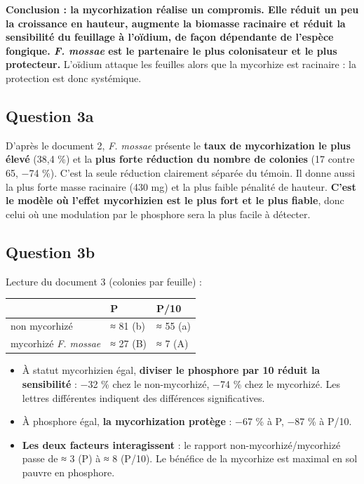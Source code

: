 \documentclass[11pt,a4paper]{article}
\providecommand{\tightlist}{\setlength{\itemsep}{0pt}\setlength{\parskip}{0pt}}
\begin{document}
\textbf{Conclusion : la mycorhization réalise un compromis. Elle réduit un peu la croissance en hauteur, augmente la biomasse racinaire et réduit la sensibilité du feuillage à l'oïdium, de façon dépendante de l'espèce fongique. \emph{F. mossae} est le partenaire le plus colonisateur et le plus protecteur.} L'oïdium attaque les feuilles alors que la mycorhize est racinaire : la protection est donc systémique.

\hypertarget{question-3a}{%
\subsection{Question 3a}\label{question-3a}}

D'après le document 2, \emph{F. mossae} présente le \textbf{taux de mycorhization le plus élevé} (38,4 \%) et la \textbf{plus forte réduction du nombre de colonies} (17 contre 65, −74 \%). C'est la seule réduction clairement séparée du témoin. Il donne aussi la plus forte masse racinaire (430 mg) et la plus faible pénalité de hauteur. \textbf{C'est le modèle où l'effet mycorhizien est le plus fort et le plus fiable}, donc celui où une modulation par le phosphore sera la plus facile à détecter.

\hypertarget{question-3b}{%
\subsection{Question 3b}\label{question-3b}}

Lecture du document 3 (colonies par feuille) :

\begin{longtable}[]{@{}lll@{}}
\toprule\noalign{}
& P & P/10 \\
\midrule\noalign{}
\endhead
\bottomrule\noalign{}
\endlastfoot
non mycorhizé & ≈ 81 (b) & ≈ 55 (a) \\
mycorhizé \emph{F. mossae} & ≈ 27 (B) & ≈ 7 (A) \\
\end{longtable}

\begin{itemize}
\tightlist
\item
  À statut mycorhizien égal, \textbf{diviser le phosphore par 10 réduit la sensibilité} : −32 \% chez le non-mycorhizé, −74 \% chez le mycorhizé. Les lettres différentes indiquent des différences significatives.
\item
  À phosphore égal, \textbf{la mycorhization protège} : −67 \% à P, −87 \% à P/10.
\item
  \textbf{Les deux facteurs interagissent} : le rapport non-mycorhizé/mycorhizé passe de ≈ 3 (P) à ≈ 8 (P/10). Le bénéfice de la mycorhize est maximal en sol pauvre en phosphore.
\end{itemize}
\end{document}
